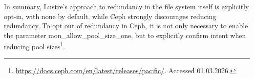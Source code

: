 In summary, Lustre's approach to redundancy in the file system itself is explicitly opt-in, with none by default, while Ceph strongly discourages reducing redundancy. To opt out of redundancy in Ceph, it is not only necessary to enable the parameter mon\_allow\_pool\_size\_one, but to explicitly confirm intent when reducing pool sizes\footnote{\url{https://docs.ceph.com/en/latest/releases/pacific/}. Accessed 01.03.2026.}.








